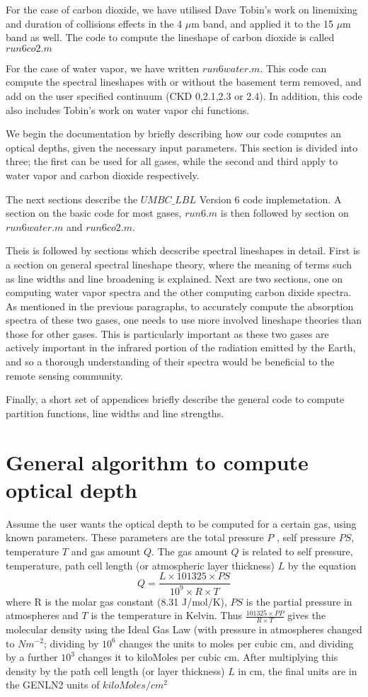 \documentclass[11pt]{article}
\begin{document}
For the case of carbon dioxide, we have utilised Dave Tobin's work on 
linemixing and duration of collisions effects in the 4 $\mu$m band, and
applied it to the 15 $\mu$m band as well. The code to compute the lineshape 
of carbon dioxide is called $run6co2.m$

For the case of water vapor, we have written $run6water.m$. This code can 
compute the spectral lineshapes with or without the basement term removed,
and add on the user specified continuum (CKD 0,2.1,2.3 or 2.4). In addition,
this code also includes Tobin's work on water vapor chi functions.

We begin the documentation by briefly describing how our code computes an 
optical depths, given the necessary input parameters. This section is 
divided into three; the first can be used for all gases, while the second 
and third apply to water vapor and carbon dioxide respectively.

The next sections describe the $UMBC\_LBL$ Version 6 code implemetation. 
A section on the basic code for most gases, $run6.m$ is then followed by 
section on $run6water.m$ and $run6co2.m$.

Theis is followed by sections which decscribe spectral 
lineshapes in detail. First is a section  on general spectral lineshape 
theory, where the meaning of terms such as line widths and line broadening 
is explained. Next are two sections, one on 
computing water vapor spectra and the other computing carbon dixide 
spectra. As mentioned in the previous paragraphs, to accurately compute 
the absorption spectra of these two gases, one needs to use more involved 
lineshape theories than those for other gases. This is particularly 
important as these two gases are actively important in the infrared 
portion of the radiation emitted by the Earth, and so a thorough 
understanding of their spectra would be beneficial to the remote sensing 
community. 
 
Finally, a short set of appendices briefly describe the general code to 
compute partition functions, line widths and line strengths. 

\section{General algorithm to compute optical depth}
Assume the user wants the optical depth to be computed for a certain gas, 
using known parameters. These parameters are the total pressure $P$ , 
self pressure $PS$, temperature $T$ and gas amount $Q$. The gas amount $Q$ 
is related to self pressure, temperature, path cell length 
(or atmospheric layer thickness) $L$ by the equation 
\[ 
Q = \frac{L \times 101325 \times PS}{10^{9} \times R \times T}
\]
where R is the molar gas constant (8.31 J/mol/K), $PS$ is the partial 
pressure in atmospheres and $T$ is the temperature in Kelvin. Thus 
$\frac{101325 \times PP}{R \times T}$ gives the molecular density using 
the Ideal Gas Law (with pressure in atmospheres changed to $Nm^{-2}$; 
dividing by $10^{6}$ changes the units to moles per cubic cm, and dividing 
by a further $10^{3}$ changes it to kiloMoles per cubic cm. After 
multiplying this density by the path cell length  (or layer thickness) $L$ 
in cm, the final units are in the GENLN2 units of $kiloMoles/cm^{2}$
 
\end{document}
